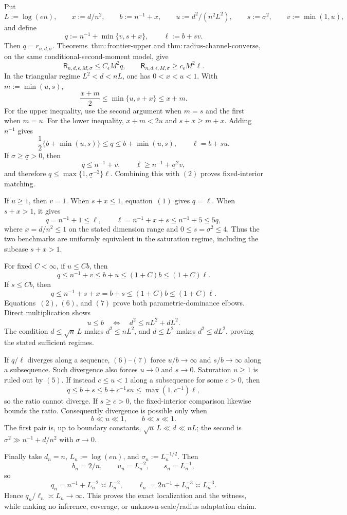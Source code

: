 Put
\[
 L:=\log(en),\qquad x:=d/n^2,\qquad b:=n^{-1}+x,\qquad
 u:=d^2/(n^2L^2),\qquad s:=\sigma^2,\qquad v:=\min(1,u),
\]
and define
\[
 q:=n^{-1}+\min\{v,s+x\},\qquad \ell:=b+sv.
\tag{1}
\]
Then \(q=r_{n,d,\sigma}\).  Theorems~\(\mathrm{thm:frontier\text{-}upper}\) and \(\mathrm{thm:radius\text{-}channel\text{-}converse}\), on the same conditional-second-moment model, give
\[
 \mathsf R_{n,d,\epsilon,M,\sigma}\le C_\epsilon M^2q,
 \qquad
 \mathsf R_{n,d,\epsilon,M,\sigma}\ge c_\epsilon M^2\ell.
\tag{2}
\]
In the triangular regime \(L^2<d<nL\), one has \(0<x<u<1\).  With \(m:=\min(u,s)\),
\[
 \frac{x+m}{2}\le\min\{u,s+x\}\le x+m.
\tag{3}
\]
For the upper inequality, use the second argument when \(m=s\) and the first when \(m=u\).  For the lower inequality, \(x+m<2u\) and \(s+x\ge m+x\).  Adding \(n^{-1}\) gives
\[
 \frac12\{b+\min(u,s)\}\le q\le b+\min(u,s),
 \qquad \ell=b+su.
\tag{4}
\]
If \(\sigma\ge\underline\sigma>0\), then
\[
 q\le n^{-1}+v,\qquad \ell\ge n^{-1}+\underline\sigma^2v,
\]
and therefore \(q\le\max\{1,\underline\sigma^{-2}\}\ell\).  Combining this with \((2)\) proves fixed-interior matching.

If \(u\ge1\), then \(v=1\).  When \(s+x\le1\), equation~\((1)\) gives \(q=\ell\).  When \(s+x>1\), it gives
\[
 q=n^{-1}+1\le\ell,
 \qquad
 \ell=n^{-1}+x+s\le n^{-1}+5\le5q,
\tag{5}
\]
where \(x=d/n^2\le1\) on the stated dimension range and \(0\le s=\sigma^2\le4\).  Thus the two benchmarks are uniformly equivalent in the saturation regime, including the subcase \(s+x>1\).

For fixed \(C<\infty\), if \(u\le Cb\), then
\[
 q\le n^{-1}+v\le b+u\le(1+C)b\le(1+C)\ell.
\tag{6}
\]
If \(s\le Cb\), then
\[
 q\le n^{-1}+s+x=b+s\le(1+C)b\le(1+C)\ell.
\tag{7}
\]
Equations~\((2)\), \((6)\), and \((7)\) prove both parametric-dominance elbows.  Direct multiplication shows
\[
 u\le b\quad\Longleftrightarrow\quad d^2\le nL^2+dL^2.
\tag{8}
\]
The condition \(d\le\sqrt n\,L\) makes \(d^2\le nL^2\), and \(d\le L^2\) makes \(d^2\le dL^2\), proving the stated sufficient regimes.

If \(q/\ell\) diverges along a sequence, \((6)\)--\((7)\) force \(u/b\to\infty\) and \(s/b\to\infty\) along a subsequence.  Such divergence also forces \(u\to0\) and \(s\to0\).  Saturation \(u\ge1\) is ruled out by \((5)\).  If instead \(c\le u<1\) along a subsequence for some \(c>0\), then
\[
 q\le b+s\le b+c^{-1}su\le\max(1,c^{-1})\ell,
\]
so the ratio cannot diverge.  If \(s\ge c>0\), the fixed-interior comparison likewise bounds the ratio.  Consequently divergence is possible only when
\[
 b\ll u\ll1,\qquad b\ll s\ll1.
\tag{9}
\]
The first pair is, up to boundary constants, \(\sqrt n\,L\ll d\ll nL\); the second is \(\sigma^2\gg n^{-1}+d/n^2\) with \(\sigma\to0\).

Finally take \(d_n=n\), \(L_n:=\log(en)\), and \(\sigma_n:=L_n^{-1/2}\).  Then
\[
 b_n=2/n,\qquad u_n=L_n^{-2},\qquad s_n=L_n^{-1},
\]
so
\[
 q_n=n^{-1}+L_n^{-2}\asymp L_n^{-2},\qquad
 \ell_n=2n^{-1}+L_n^{-3}\asymp L_n^{-3}.
\]
Hence \(q_n/\ell_n\asymp L_n\to\infty\).  This proves the exact localization and the witness, while making no inference, coverage, or unknown-scale/radius adaptation claim.